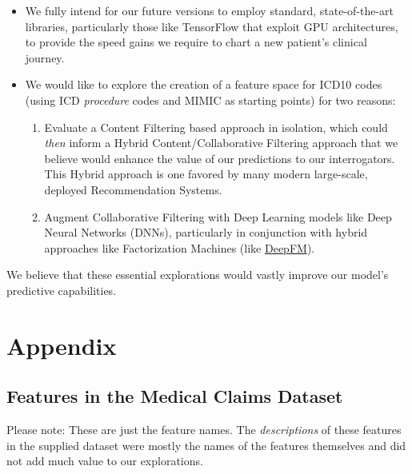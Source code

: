 \documentclass[twoside,11pt]{article}
\begin{document}
{\begin{itemize}
  \item We fully intend for our future versions to employ standard, state-of-the-art libraries, particularly those like TensorFlow that exploit GPU architectures, to provide the speed gains we require to chart a new patient's clinical journey.

  \item We would like to explore the creation of a feature space for ICD10 codes (using ICD \textit{procedure} codes and MIMIC as starting points) for two reasons:

	\begin{enumerate}
	  \item Evaluate a Content Filtering based approach in isolation, which could \textit{then} inform a Hybrid Content/Collaborative Filtering approach that we believe would enhance the value of our predictions to our interrogators. This Hybrid approach is one favored by many modern large-scale, deployed Recommendation Systems.

	  \item Augment Collaborative Filtering with Deep Learning models like Deep Neural Networks (DNNs), particularly in conjunction with hybrid approaches like Factorization Machines (like \href{https://arxiv.org/abs/1703.04247}{DeepFM}).
	\end{enumerate}
\end{itemize}

We believe that these essential explorations would vastly improve our model's predictive capabilities.


\newpage
\section{Appendix}
\subsection{Features in the Medical Claims Dataset} \label{appendix:features:medical}

Please note: These are just the feature names. The \textit{descriptions} of these features in the supplied dataset were mostly the names of the features themselves and did not add much value to our explorations.

}
\end{document}
